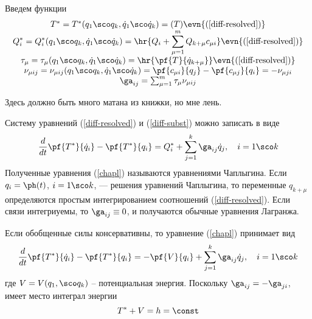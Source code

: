 \documentclass[a4paper,12pt]{article}
\begin{document}
Введем функции
\newcommand{\qlast}{q_1\sco q_k, \dot q_1\sco \dot q_k}
\begin{displaymath}
\label{chapl:asterix}
\begin{array}{c}
  T^* = T^*(\qlast) = (T)\evn{(\ref{diff-resolved})} \\
  \displaystyle
  Q_i^* = Q_i^*(\qlast) =\hr{Q_i + \sum_{\mu =1 }^mQ_{k+\mu}c_{\mu i}}\evn{(\ref{diff-resolved})} \\
  \tau_\mu = \tau_\mu(\qlast) = \hr{\pf{T}{\dot q_{k+\mu}}}\evn{(\ref{diff-resolved})}\\
    \nu_{\mu ij} = \nu_{\mu ij}(\qlast) = \pf{c_{\mu i}}{q_j} - \pf{c_{\mu j}}{q_i} = -\nu_{\mu ji} \\
    \ga_{ij} = \sum_{\mu=1}^m \tau_\mu\nu_{\mu ij}
\end{array}
\end{displaymath}
\begin{petit}
  Здесь должно быть много матана из книжки, но мне лень.
\end{petit}
Систему уравнений (\ref{diff-resolved}) и (\ref{diff-subst}) можно
записать в виде
\begin{equation}
  \label{chapl}
  \frac{d}{dt}\pf{T^*}{\dot q_i} -\pf{T^*}{q_i} = Q^*_i +
  \sum_{j=1}^k\ga_{ij}\dot q_j, \quad i =1\sco k
\end{equation}
Полученные уравнения (\ref{chapl}) называются уравнениями
Чаплыгина. Если $q_i = \ph(t)$, $i = 1\sco k$, --- решения уравнений
Чаплыгина, то переменные $q_{k+\mu}$ определяются простым
интегрированием соотношений (\ref{diff-resolved}). Если связи
интегриуемы, то $\ga_{ij} \equiv 0$, и получаются обычные уравнения Лагранжа.
\begin{note}
  Если обобщенные силы консервативны, то уравнение (\ref{chapl})
  принимает вид
  \begin{equation}
    \frac{d}{dt}\pf{T^*}{\dot q_i} - \pf{T^*}{q_i} = -\pf{V}{q_i} +\sum_{j=1}^k\ga_{ij}\dot q_j, \quad i = 1\sco k
  \end{equation}
  где $V = V(q_1,\sco q_k)$ -- потенциальная энергия. Поскольку
  $\ga_{ij} = -\ga_{ji}$, имеет место интеграл энергии
  \begin{equation*}
    T^*+V = h =\const
  \end{equation*}

\end{note}
\end{document}
